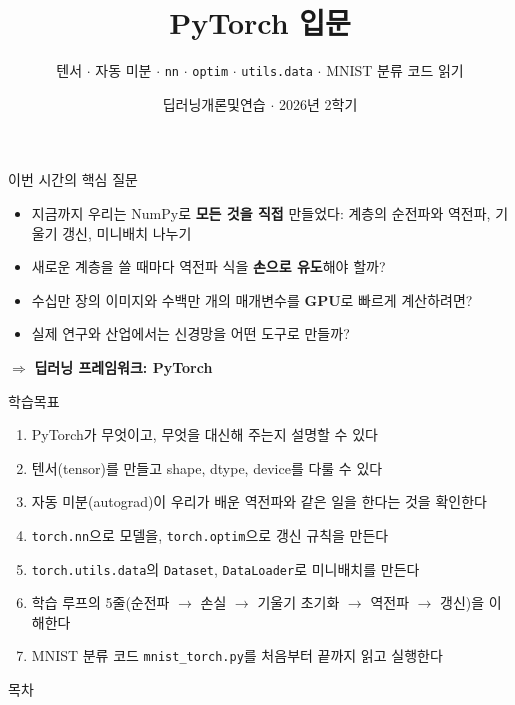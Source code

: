 \documentclass[aspectratio=169,11pt]{beamer}
\title{PyTorch 입문}
\subtitle{텐서 $\cdot$ 자동 미분 $\cdot$ \texttt{nn} $\cdot$ \texttt{optim} $\cdot$ \texttt{utils.data} $\cdot$ MNIST 분류 코드 읽기}
\date{딥러닝개론및연습 $\cdot$ 2026년 2학기}
\newcommand{\code}[1]{\texttt{#1}}
\begin{document}
\begin{frame}[plain]
\titlepage
\end{frame}

\begin{frame}{이번 시간의 핵심 질문}
\begin{keybox}[이번 시간의 핵심 질문]
\begin{itemize}
\item 지금까지 우리는 NumPy로 \textbf{모든 것을 직접} 만들었다: 계층의 순전파와 역전파, 기울기 갱신, 미니배치 나누기
\item 새로운 계층을 쓸 때마다 역전파 식을 \textbf{손으로 유도}해야 할까?
\item 수십만 장의 이미지와 수백만 개의 매개변수를 \textbf{GPU}로 빠르게 계산하려면?
\item 실제 연구와 산업에서는 신경망을 어떤 도구로 만들까?
\end{itemize}
\end{keybox}
\vskip2mm
\begin{center}
\large $\Rightarrow$ \textbf{딥러닝 프레임워크: PyTorch}
\end{center}
\end{frame}

\begin{frame}{학습목표}
\begin{enumerate}
\item PyTorch가 무엇이고, 무엇을 대신해 주는지 설명할 수 있다
\item 텐서(tensor)를 만들고 shape, dtype, device를 다룰 수 있다
\item 자동 미분(autograd)이 우리가 배운 역전파와 같은 일을 한다는 것을 확인한다
\item \code{torch.nn}으로 모델을, \code{torch.optim}으로 갱신 규칙을 만든다
\item \code{torch.utils.data}의 \code{Dataset}, \code{DataLoader}로 미니배치를 만든다
\item 학습 루프의 5줄(순전파 $\to$ 손실 $\to$ 기울기 초기화 $\to$ 역전파 $\to$ 갱신)을 이해한다
\item MNIST 분류 코드 \code{mnist\_torch.py}를 처음부터 끝까지 읽고 실행한다
\end{enumerate}
\end{frame}

\begin{frame}{목차}
\small
\tableofcontents
\end{frame}
\end{document}
